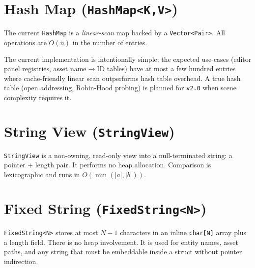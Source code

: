 \section{Hash Map (\texttt{HashMap<K,V>})}

The current \texttt{HashMap} is a \emph{linear-scan} map backed by a
\texttt{Vector<Pair>}. All operations are $O(n)$ in the number of entries.

\begin{remark}
The current implementation is intentionally simple: the expected
use-cases (editor panel registries, asset name$\to$ID tables) have at
most a few hundred entries where cache-friendly linear scan outperforms
hash table overhead. A true hash table (open addressing, Robin-Hood
probing) is planned for \texttt{v2.0} when scene complexity requires it.
\end{remark}

\section{String View (\texttt{StringView})}

\texttt{StringView} is a non-owning, read-only view into a null-terminated
string: a pointer + length pair. It performs no heap allocation. Comparison
is lexicographic and runs in $O(\min(|a|, |b|))$.

\section{Fixed String (\texttt{FixedString<N>})}

\texttt{FixedString<N>} stores at most $N-1$ characters in an inline
\texttt{char[N]} array plus a length field. There is no heap involvement.
It is used for entity names, asset paths, and any string that must be
embeddable inside a struct without pointer indirection.
